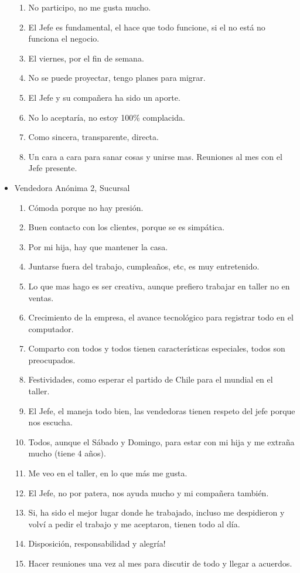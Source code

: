 \begin{itemize}
\begin{enumerate}
        \item No participo, no me gusta mucho.
        \item El Jefe es fundamental, el hace que todo funcione, si el no está no funciona el negocio.
        \item El viernes, por el fin de semana.
        \item No se puede proyectar, tengo planes para migrar.
        \item El Jefe y su compañera ha sido un aporte.
        \item No lo aceptaría, no estoy 100\% complacida.
        \item Como sincera, transparente, directa.
        \item Un cara a cara para sanar cosas y unirse mas. Reuniones al mes con el Jefe presente.
    \end{enumerate}
    \item Vendedora Anónima 2, Sucursal 
    \begin{enumerate}
        \item Cómoda porque no hay presión.
        \item Buen contacto con los clientes, porque se es simpática.
        \item Por mi hija, hay que mantener la casa.
        \item Juntarse fuera del trabajo, cumpleaños, etc, es muy entretenido.
        \item Lo que mas hago es ser creativa, aunque prefiero trabajar en taller no en ventas.
        \item Crecimiento de la empresa, el avance tecnológico para registrar todo en el computador.
        \item Comparto con todos y todos tienen características especiales, todos son preocupados.
        \item Festividades, como esperar el partido de Chile para el mundial en el taller.
        \item El Jefe, el maneja todo bien, las vendedoras tienen respeto del jefe porque nos escucha.
        \item Todos, aunque el Sábado y Domingo, para estar con mi hija y me extraña mucho (tiene 4 años).
        \item Me veo en el taller, en lo que más me gusta.
        \item El Jefe, no por patera, nos ayuda mucho y mi compañera también.
        \item Si, ha sido el mejor lugar donde he trabajado, incluso me despidieron y volví a pedir el trabajo y me aceptaron, tienen todo al día.
        \item Disposición, responsabilidad y alegría!
        \item Hacer reuniones una vez al mes para discutir de todo y llegar a acuerdos.
    \end{enumerate}
\end{itemize}


